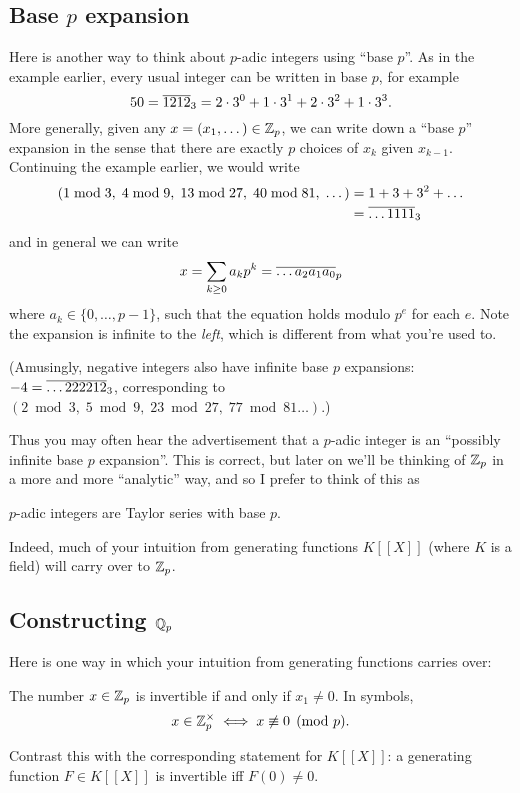 \subsection{Base $p$ expansion}
Here is another way to think about $p$-adic integers using ``base $p$''.
As in the example earlier, every usual integer can be written in base $p$,
for example
\[ 50 = \overline{1212}_3 = 2 \cdot 3^0 + 1 \cdot 3^1 + 2 \cdot 3^2 + 1 \cdot 3^3. \]
More generally, given any $x = (x_1, \dots) \in \mathbb Z_p$,
we can write down a ``base $p$'' expansion in the sense
that there are exactly $p$ choices of $x_k$ given $x_{k-1}$.
Continuing the example earlier, we would write
\begin{align*}
	\left( 1 \bmod 3, \; 4 \bmod 9, \;
	13 \bmod{27}, \; 40 \bmod{81}, \; \dots \right)
	&= 1 + 3 + 3^2 + \dots \\
	&= \overline{\dots1111}_3
\end{align*}
and in general we can write
\[ x = \sum_{k \ge 0} a_k p^k = \overline{\dots a_2 a_1 a_0}_p \]
where $a_k \in \{0, \dots, p-1\}$,
such that the equation holds modulo $p^e$ for each $e$.
Note the expansion is infinite to the \emph{left},
which is different from what you're used to.

(Amusingly, negative integers also have infinite base $p$ expansions:
$-4 = \overline{\dots222212}_3$, corresponding to
$(2 \bmod 3, \; 5 \bmod 9, \; 23 \bmod{27}, \; 77 \bmod{81} \dots)$.)

Thus you may often hear the advertisement that a $p$-adic integer
is an ``possibly infinite base $p$ expansion''.
This is correct, but later on we'll be thinking of $\mathbb Z_p$ in
a more and more ``analytic'' way,
and so I prefer to think of this as
\begin{moral}
	$p$-adic integers are Taylor series with base $p$.
\end{moral}
Indeed, much of your intuition from generating functions $K[[X]]$
(where $K$ is a field) will carry over to $\mathbb Z_p$.

\subsection{Constructing $\mathbb Q_p$}
Here is one way in which your intuition from generating functions carries over:
\begin{proposition}
	The number $x \in \mathbb Z_p$ is invertible if and only if $x_1 \neq 0$.
	In symbols,
	\[ x \in \mathbb Z_p^\times \iff x \not\equiv 0 \pmod p. \]
\end{proposition}
Contrast this with the corresponding statement for $K[ [ X ] ]$:
a generating function $F \in K[ [ X ] ]$ is invertible iff $F(0) \neq 0$.

